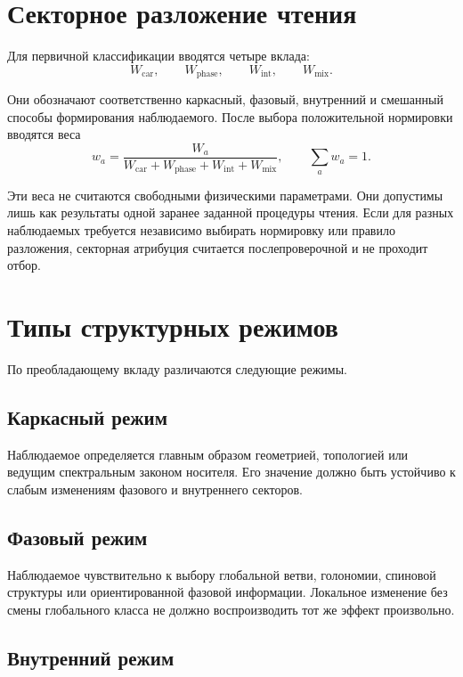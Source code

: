 \chapter{Секторное разложение чтения}

Для первичной классификации вводятся четыре вклада:
\begin{equation}
 W_{\mathrm{car}},\qquad W_{\mathrm{phase}},\qquad
 W_{\mathrm{int}},\qquad W_{\mathrm{mix}}.
\end{equation}

Они обозначают соответственно каркасный, фазовый, внутренний и смешанный
способы формирования наблюдаемого. После выбора положительной нормировки
вводятся веса
\begin{equation}
 w_a=\frac{W_a}{
 W_{\mathrm{car}}+W_{\mathrm{phase}}+W_{\mathrm{int}}+W_{\mathrm{mix}}},
 \qquad
 \sum_a w_a=1.
\end{equation}

Эти веса не считаются свободными физическими параметрами. Они допустимы лишь
как результаты одной заранее заданной процедуры чтения. Если для разных
наблюдаемых требуется независимо выбирать нормировку или правило разложения,
секторная атрибуция считается послепроверочной и не проходит отбор.

\chapter{Типы структурных режимов}

По преобладающему вкладу различаются следующие режимы.

\section{Каркасный режим}

Наблюдаемое определяется главным образом геометрией, топологией или ведущим
спектральным законом носителя. Его значение должно быть устойчиво к слабым
изменениям фазового и внутреннего секторов.

\section{Фазовый режим}

Наблюдаемое чувствительно к выбору глобальной ветви, голономии, спиновой
структуры или ориентированной фазовой информации. Локальное изменение без
смены глобального класса не должно воспроизводить тот же эффект произвольно.

\section{Внутренний режим}

